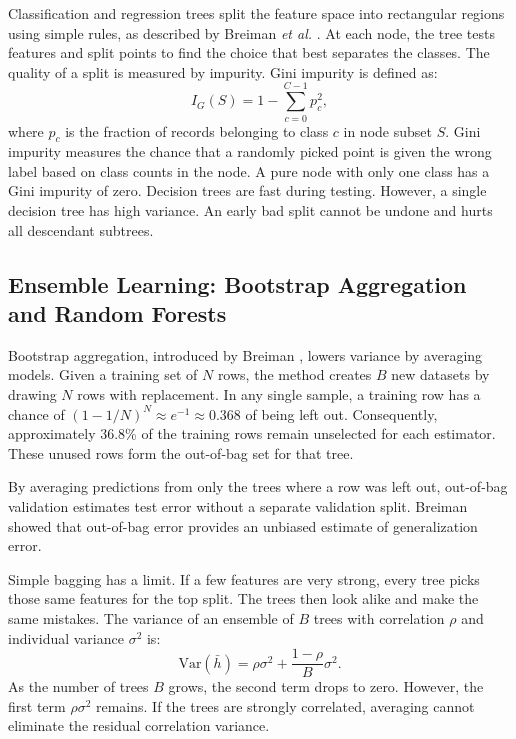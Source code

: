 \documentclass[conference,10pt]{IEEEtran}
\begin{document}
Classification and regression trees split the feature space into rectangular regions using simple rules, as described by Breiman \textit{et al.} \cite{breiman1984}. At each node, the tree tests features and split points to find the choice that best separates the classes. The quality of a split is measured by impurity. Gini impurity is defined as:
\begin{equation}
I_G(S) = 1 - \sum_{c=0}^{C-1} p_c^2 ,
\end{equation}
where $p_c$ is the fraction of records belonging to class $c$ in node subset $S$. Gini impurity measures the chance that a randomly picked point is given the wrong label based on class counts in the node. A pure node with only one class has a Gini impurity of zero. Decision trees are fast during testing. However, a single decision tree has high variance. An early bad split cannot be undone and hurts all descendant subtrees.

\subsection{Ensemble Learning: Bootstrap Aggregation and Random Forests}

Bootstrap aggregation, introduced by Breiman \cite{breiman1996}, lowers variance by averaging models. Given a training set of $N$ rows, the method creates $B$ new datasets by drawing $N$ rows with replacement. In any single sample, a training row has a chance of $(1 - 1/N)^N \approx e^{-1} \approx 0.368$ of being left out. Consequently, approximately 36.8\% of the training rows remain unselected for each estimator. These unused rows form the out-of-bag set for that tree.

By averaging predictions from only the trees where a row was left out, out-of-bag validation estimates test error without a separate validation split. Breiman \cite{breiman1996} showed that out-of-bag error provides an unbiased estimate of generalization error.

Simple bagging has a limit. If a few features are very strong, every tree picks those same features for the top split. The trees then look alike and make the same mistakes. The variance of an ensemble of $B$ trees with correlation $\rho$ and individual variance $\sigma^2$ is:
\begin{equation}
\mathrm{Var}(\bar{h}) = \rho \sigma^2 + \frac{1 - \rho}{B} \sigma^2 .
\end{equation}
As the number of trees $B$ grows, the second term drops to zero. However, the first term $\rho \sigma^2$ remains. If the trees are strongly correlated, averaging cannot eliminate the residual correlation variance.
\end{document}
